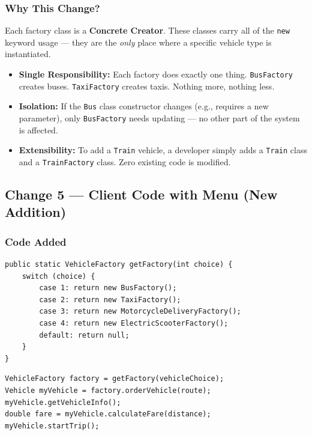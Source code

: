 \documentclass[12pt, a4paper]{article}
\begin{document}
\subsubsection{Why This Change?}

Each factory class is a \textbf{Concrete Creator}. These classes carry all of the \texttt{new} keyword usage --- they are the \textit{only} place where a specific vehicle type is instantiated.

\begin{itemize}[leftmargin=*, label=\textcolor{primaryblue}{\textbullet}]
    \item \textbf{Single Responsibility:} Each factory does exactly one thing. \texttt{BusFactory} creates buses. \texttt{TaxiFactory} creates taxis. Nothing more, nothing less.
    \item \textbf{Isolation:} If the \texttt{Bus} class constructor changes (e.g., requires a new parameter), only \texttt{BusFactory} needs updating --- no other part of the system is affected.
    \item \textbf{Extensibility:} To add a \texttt{Train} vehicle, a developer simply adds a \texttt{Train} class and a \texttt{TrainFactory} class. Zero existing code is modified.
\end{itemize}

\subsection{Change 5 --- Client Code with Menu (New Addition)}

\subsubsection{Code Added}

\begin{lstlisting}[caption={Client code --- getFactory() helper method}]
public static VehicleFactory getFactory(int choice) {
    switch (choice) {
        case 1: return new BusFactory();
        case 2: return new TaxiFactory();
        case 3: return new MotorcycleDeliveryFactory();
        case 4: return new ElectricScooterFactory();
        default: return null;
    }
}
\end{lstlisting}

\begin{lstlisting}[caption={Client code --- using the factory (no direct new Vehicle())}]
VehicleFactory factory = getFactory(vehicleChoice);
Vehicle myVehicle = factory.orderVehicle(route);
myVehicle.getVehicleInfo();
double fare = myVehicle.calculateFare(distance);
myVehicle.startTrip();
\end{lstlisting}
\end{document}
